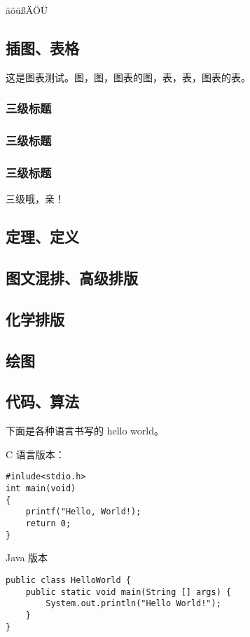 \documentclass[%
               print, 
               timesmath
              ]{xjtubsc}
\begin{document}
äöüßÄÖÜ

\subsection{插图、表格}
这是图表测试。图，图，图表的图，表，表，图表的表。
\subsubsection{三级标题}
\subsubsection{三级标题}
\subsubsection{三级标题}
三级哦，亲！

\subsection{定理、定义}

\subsection{图文混排、高级排版}

\subsection{化学排版}


\subsection{绘图}

\subsection{代码、算法}

下面是各种语言书写的 hello world。

C 语言版本：
\begin{verbatim}
#inlude<stdio.h>
int main(void)	
{
    printf("Hello, World!);
    return 0;
}
\end{verbatim}

Java 版本
\begin{verbatim}
public class HelloWorld {
    public static void main(String [] args) {
        System.out.println("Hello World!");
    }
}
\end{verbatim}
\end{document}
